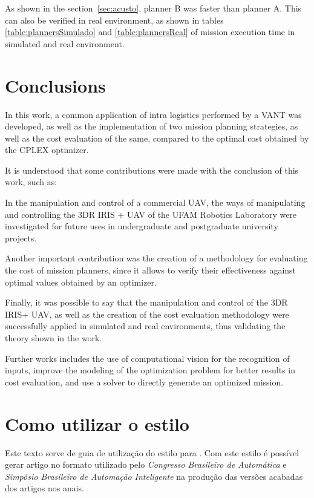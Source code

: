 \documentclass[conference,harvard,brazil,english]{sbatex}
\begin{document}
	As shown in the section~\ref{sec:acusto}, planner B was faster than planner A. This can also be verified in real environment, as shown in tables \ref{table:plannersSimulado} and \ref{table:plannersReal} of mission execution time in simulated and real environment.

\section{Conclusions}
\label{chapter:conclusao}

In this work, a common application of intra logistics performed by a VANT was developed, as well as the implementation of two mission planning strategies, as well as the cost evaluation of the same, compared to the optimal cost obtained by the CPLEX optimizer.

It is understood that some contributions were made with the conclusion of this work, such as:

In the manipulation and control of a commercial UAV, the ways of manipulating and controlling the 3DR IRIS + UAV of the UFAM Robotics Laboratory were investigated for future uses in undergraduate and postgraduate university projects.


Another important contribution was the creation of a methodology for evaluating the cost of mission planners, since it allows to verify their effectiveness against optimal values obtained by an optimizer.

Finally, it was possible to say that the manipulation and control of the 3DR IRIS+ UAV, as well as the creation of the cost evaluation methodology were successfully applied in simulated and real environments, thus validating the theory shown in the work.

Further works includes the use of computational vision for the recognition of inputs, improve the modeling of the optimization problem for better results in cost evaluation, and use a solver to directly generate an optimized mission.



\section{Como utilizar o estilo \SBATeX}
Este texto serve de guia de utilização do estilo \SBATeX para
\LaTeXe. Com este estilo é possível gerar artigo no formato utilizado pelo \emph{Congresso
  Brasileiro de Automática} e \emph{Simpósio Brasileiro de Automação Inteligente} na produção das versões acabadas dos artigos
  nos anais.
\end{document}
